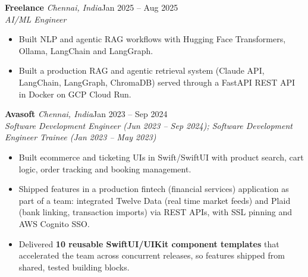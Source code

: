 \documentclass[a4paper,11pt]{article}
\newcommand{\role}[4]{%
  \textbf{#1}{\color{muted}\,\textperiodcentered\,\textit{#2}}\hfill{\color{muted}#3}\\
  \textit{#4}\par}
\newcommand{\gap}{\vspace{5pt}}
\newcommand{\num}[1]{\textbf{#1}}   %
\begin{document}
\gap
{}
\role{Freelance}{Chennai, India}{Jan 2025 – Aug 2025}{AI/ML Engineer}
\begin{itemize}
  \item Built NLP and agentic RAG workflows with Hugging Face Transformers, Ollama, LangChain and LangGraph.
  \item Built a production RAG and agentic retrieval system (Claude API, LangChain, LangGraph, ChromaDB) served through a FastAPI REST API in Docker on GCP Cloud Run.
\end{itemize}
\gap
{}
\role{Avasoft}{Chennai, India}{Jan 2023 – Sep 2024}{Software Development Engineer (Jun 2023 – Sep 2024); Software Development Engineer Trainee (Jan 2023 – May 2023)}
\begin{itemize}
  \item Built ecommerce and ticketing UIs in Swift/SwiftUI with product search, cart logic, order tracking and booking management.
  \item Shipped features in a production fintech (financial services) application as part of a team: integrated Twelve Data (real time market feeds) and Plaid (bank linking, transaction imports) via REST APIs, with SSL pinning and AWS Cognito SSO.
  \item Delivered \num{10 reusable SwiftUI/UIKit component templates} that accelerated the team across concurrent releases, so features shipped from shared, tested building blocks.
\end{itemize}
\end{document}
